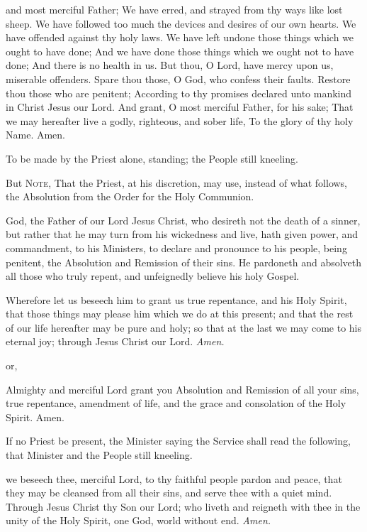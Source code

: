  and most merciful Father; We have erred, and strayed from thy ways like lost sheep. We have followed too much the devices and desires of our own hearts. We have offended against thy holy laws. We have left undone those things which we ought to have done; And we have done those things which we ought not to have done; And there is no health in us. But thou, O Lord, have mercy upon us, miserable offenders. Spare thou those, O God, who confess their faults. Restore thou those who are penitent; According to thy promises declared unto mankind in Christ Jesus our Lord. And grant, O most merciful Father, for his sake; That we may hereafter live a godly, righteous, and sober life, To the glory of thy holy Name. Amen.
\begin{rubric}
    To be made by the Priest alone, standing; the People still kneeling.
\end{rubric}
\begin{rubric}
    But \textsc{Note}, That the Priest, at his discretion, may use, instead of what follows, the Absolution from the Order for the Holy Communion.
\end{rubric}
 God, the Father of our Lord Jesus Christ, who desireth not the death of a sinner, but rather that he may turn from his wickedness and live, hath given power, and commandment, to his Ministers, to declare and pronounce to his people, being penitent, the Absolution and Remission of their sins. He pardoneth and {} absolveth all those who truly repent, and unfeignedly believe his holy Gospel.
\par
Wherefore let us beseech him to grant us true repentance, and his Holy Spirit, that those things may please him which we do at this present; and that the rest of our life hereafter may be pure and holy; so that at the last we may come to his eternal joy; through Jesus Christ our Lord. \textit{Amen.}
\begin{inhead}
    or,
\end{inhead}
 Almighty and merciful Lord grant you Absolution {} and Remission of all your sins, true repentance, amendment of life, and the grace and consolation of the Holy Spirit. Amen.
\begin{rubric}
    If no Priest be present, the Minister saying the Service shall read the following, that Minister and the People still kneeling.
\end{rubric}
 we beseech thee, merciful Lord, to thy faithful people pardon and peace, that they may be cleansed from all their sins, and serve thee with a quiet mind. Through Jesus Christ thy Son our Lord; who liveth and reigneth with thee in the unity of the Holy Spirit, one God, world without end. \textit{Amen.}

